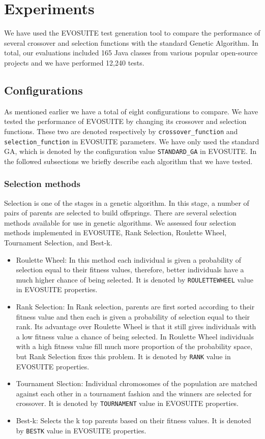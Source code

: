 \documentclass[sigconf]{acmart}
\begin{document}
\section{Experiments}
\label{experiments}
We have used the EVOSUITE test generation tool to compare the performance of several crossover 
and selection functions with the standard Genetic Algorithm. 
In total, our evaluations included 165 Java classes from various popular open-source projects 
and we have performed 12,240 tests. 

\subsection{Configurations}
As mentioned earlier we have a total of eight configurations to compare. We have tested the performance
of EVOSUITE by changing its crossover and selection functions. These two are
denoted respectively by \verb|crossover_function| and \verb|selection_function| in EVOSUITE parameters. 
We have only used the standard GA, which is denoted by the configuration value \verb|STANDARD_GA| in EVOSUITE.
In the followed subsections we briefly describe each algorithm that we have tested.

\subsubsection{Selection methods}
Selection is one of the stages in a genetic algorithm. In this stage, a number of pairs of parents
are selected to build offsprings. There are several selection methods available for use in genetic algorithms.
We assessed four selection methods implemented in EVOSUITE, Rank Selection, Roulette Wheel, Tournament Selection, 
and Best-k.
\begin{itemize}
  \item{Roulette Wheel}: In this method each individual is given a probability of selection equal to 
  their fitness values, therefore, better individuals have a much higher chance of being selected. It is denoted
  by \verb|ROULETTEWHEEL| value in EVOSUITE properties.
  \item{Rank Selection}: In Rank selection, parents are first sorted according to their fitness 
  value and then each is given a probability of selection equal to their rank. Its advantage over 
  Roulette Wheel is that it still gives individuals with a low fitness value a chance of being selected.
  In Roulette Wheel individuals with a high fitness value fill much more proportion of the probability space,
  but Rank Selection fixes this problem. It is denoted by \verb|RANK| value in EVOSUITE properties.
  \item{Tournament Slection}: Individual chromosomes of the population are matched against each other
  in a tournament fashion and the winners are selected for crossover. It is denoted
  by \verb|TOURNAMENT| value in EVOSUITE properties.
  \item{Best-k}: Selects the k top parents based on their fitness values. It is denoted
  by \verb|BESTK| value in EVOSUITE properties.
\end{itemize}
\end{document}
